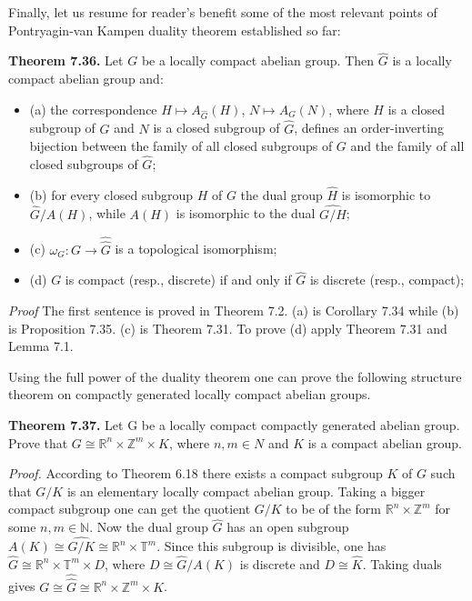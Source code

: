\documentclass[12pt]{article}
\begin{document}
\begin{itemize}
\begin{itemize}
Finally, let us resume for reader's benefit some of the most relevant points of Pontryagin-van Kampen duality
theorem established so far:


\textbf{Theorem 7.36.} Let $G$ be a locally compact abelian group. Then $\hat{G}$ is a locally compact abelian group and:


\begin{itemize}

    \item (a) the correspondence $H \mapsto A_{\hat{G}}(H)$, $N \mapsto A_G(N)$, where $H$ is a closed subgroup of $G$ and $N$ is a closed
    subgroup of $\hat{G}$, defines an order-inverting bijection between the family of all closed subgroups of $G$ and the
    family of all closed subgroups of $\hat{G}$;

    \item (b) for every closed subgroup $H$ of $G$ the dual group $\hat{H}$ is isomorphic to $\hat{G}/A (H)$, while $A(H)$ is isomorphic
    to the dual $\hat{G/H}$;

    \item (c) $\omega_G : G \to \hat{\hat{G}}$ is a topological isomorphism;

    \item (d) $G$ is compact (resp., discrete) if and only if $\hat{G}$ is discrete (resp., compact);

\end{itemize}


\emph{Proof} The first sentence is proved in Theorem 7.2. (a) is Corollary 7.34 while (b) is Proposition 7.35. (c) is
Theorem 7.31. To prove (d) apply Theorem 7.31 and Lemma 7.1.


    Using the full power of the duality theorem one can prove the following structure theorem on compactly
generated locally compact abelian groups.


\textbf{Theorem 7.37.} Let G be a locally compact compactly generated abelian group. Prove that $G \cong \mathbb{R}^n \times \mathbb{Z}^m \times K$,
where $n, m \in N$ and $K$ is a compact abelian group.


\emph{Proof.} According to Theorem 6.18 there exists a compact subgroup $K$ of $G$ such that $G/K$ is an elementary
locally compact abelian group. Taking a bigger compact subgroup one can get the quotient $G/K$ to be of the
form $\mathbb{R}^n \times \mathbb{Z}^m$ for some $n, m \in \mathbb{N}$. Now the dual group $\hat{G}$ has an open subgroup $A(K) \cong \hat{G/K} \cong \mathbb{R}^n \times \mathbb{T}^m$.
Since this subgroup is divisible, one has $\hat{G} \cong \mathbb{R}^n \times \mathbb{T}^m \times D$, where $D \cong \hat{G}/A (K)$ is discrete and $D \cong \hat{K}$. Taking
duals gives $G \cong \hat{\hat{G}} \cong \mathbb{R}^n \times \mathbb{Z}^m \times K$.



\end{itemize}
\end{itemize}
\end{document}
